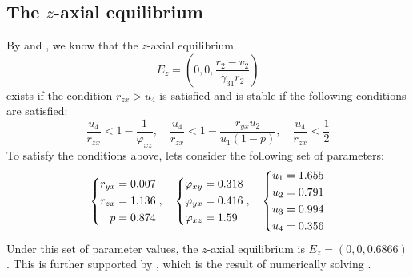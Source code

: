 \subsection{The $z$-axial equilibrium}\label{subsec:numsim_z_axial_equilibrium}
By  and , we know that the $z$-axial equilibrium
\begin{equation*}
    E_z=\left(0,0,\frac{r_2-v_2}{\gamma_{31}r_2}\right)
\end{equation*}
exists if the condition $r_{zx} > u_4$ is satisfied and is stable if the following conditions are satisfied:
\begin{equation*}
    \frac{u_4}{r_{zx}} < 1-\frac{1}{\varphi_{xz}},\quad
    \frac{u_4}{r_{zx}} < 1-\frac{r_{yx}u_2}{u_1\left(1-p\right)},\quad
    \frac{u_4}{r_{zx}} < \frac{1}{2}
\end{equation*}
To satisfy the conditions above, lets consider the following set of parameters:
\begin{equation}\label{params:axial-z}
    \begin{dcases}
        \begin{aligned}
            r_{yx} &= 0.007\\
            r_{zx} &= 1.136\\
            p &= 0.874
        \end{aligned}
    \end{dcases},\quad 
    \begin{dcases}
        \begin{aligned}
            \varphi_{xy} &= 0.318\\
            \varphi_{yx} &= 0.416\\
            \varphi_{xz} &= 1.59
        \end{aligned}
    \end{dcases},\quad 
    \begin{dcases}
        \begin{aligned}
            u_1 &= 1.655\\
            u_2 &= 0.791\\
            u_3 &= 0.994\\
            u_4 &= 0.356
        \end{aligned}
    \end{dcases}
\end{equation}
Under this set of parameter values, the $z$-axial equilibrium is $E_z=(0,0,0.6866)$. This is further supported by , which is the result of numerically solving .

